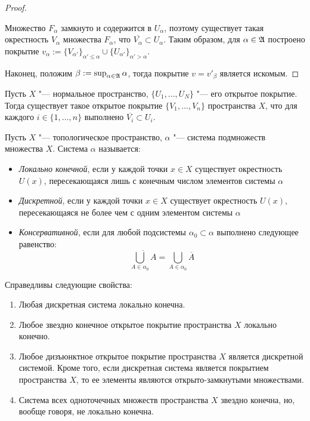 \begin{proof}
\begin{itemize}
        Множество $F_{\alpha}$ замкнуто и содержится в $U_{\alpha}$, поэтому существует такая окрестность $V_{\alpha}$ множества $F_{\alpha}$, что $\overline{V_{\alpha}}\subset U_{\alpha}$. Таким образом, для $\alpha \in \mathfrak A$ построено покрытие $v_\alpha := \{ V_{\alpha'}\}_{\alpha' \le \alpha} \cup \{U_{\alpha'}\}_{\alpha' > \alpha}$.
    \end{itemize}

    Наконец, положим $\beta := \sup_{\alpha \in \mathfrak A} \alpha$, тогда покрытие $v = v'_{\beta}$ является искомым.
\end{proof}

\begin{corollary}
    Пусть $X$ "--- нормальное пространство, $\{ U_1, \dotsc, U_N\}$ "--- его  открытое покрытие. Тогда существует такое открытое покрытие $\{V_1, \dotsc, V_n\}$ пространства $X$, что для каждого $i \in \{1, \dotsc, n\}$ выполнено $\overline{V_i}\subset U_i$.
\end{corollary}

\begin{definition}
    Пусть $X$ "--- топологическое пространство, $\alpha$ "--- система подмножеств множества $X$. Система $\alpha$ называется:
    \begin{itemize}
        \item \textit{Локально конечной}, если у каждой точки $x \in X$ существует окрестность $U(x)$, пересекающаяся лишь с конечным числом элементов системы $\alpha$
        
        \item \textit{Дискретной}, если у каждой точки $x\in X$ существует окрестность $U(x)$, пересекающаяся не более чем с одним элементом системы $\alpha$
        
        \item \textit{Консервативной}, если для любой подсистемы $\alpha_0 \subset \alpha$ выполнено следующее равенство:
        \[\overline{\bigcup_{A\in\alpha_0}A} = \bigcup_{A\in \alpha_0}\overline{A}\]
    \end{itemize}
\end{definition}

\begin{note}
    Справедливы следующие свойства:
    \begin{enumerate}
        \item Любая дискретная система локально конечна.
        
        \item Любое звездно конечное открытое покрытие пространства $X$ локально конечно.
        
        \item Любое дизъюнктное открытое покрытие пространства $X$ является
        дискретной системой. Кроме того, если дискретная система является покрытием пространства $X$, то ее элементы являются открыто-замкнутыми множествами.
        
        \item Система всех одноточечных множеств пространства $X$ звездно конечна, но, вообще говоря, не локально конечна.
    \end{enumerate}
\end{note}

